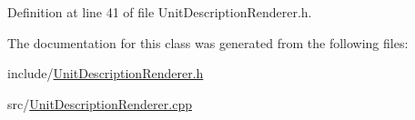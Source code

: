 Definition at line 41 of file Unit\+Description\+Renderer.\+h.



The documentation for this class was generated from the following files\+:\begin{DoxyCompactItemize}
\item 
include/\hyperlink{UnitDescriptionRenderer_8h}{Unit\+Description\+Renderer.\+h}\item 
src/\hyperlink{UnitDescriptionRenderer_8cpp}{Unit\+Description\+Renderer.\+cpp}\end{DoxyCompactItemize}
